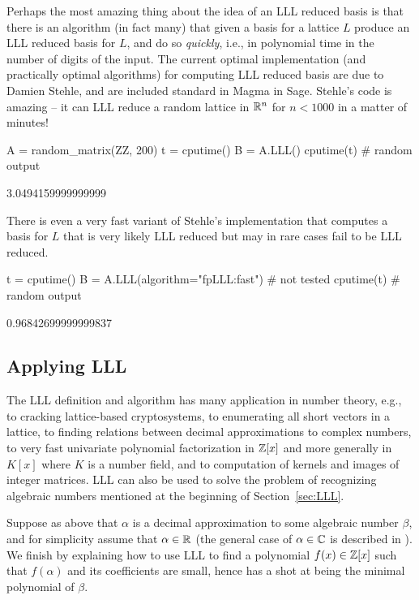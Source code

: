 Perhaps the most amazing thing about the idea of an LLL
reduced basis is that there is an algorithm (in fact many)
that given a basis for a lattice $L$ produce an LLL reduced
basis for $L$, and do so {\em quickly}, i.e., in polynomial
time in the number of digits of the input.   The current
optimal implementation (and practically optimal algorithms)
for computing LLL reduced basis are due to Damien Stehle,
and are included standard in Magma in Sage.   Stehle's code
is amazing -- it can LLL reduce a random lattice in $\mathbb{R}^{n}$
for $n<1000$ in a matter of minutes!
\begin{sagecode}
\begin{sagecell}
A = random_matrix(ZZ, 200)
t = cputime()
B = A.LLL()
cputime(t)     # random output
\end{sagecell}
\begin{sageout}
3.0494159999999999
\end{sageout}
\end{sagecode}

\noindent{}There is even a very fast variant of Stehle's implementation that computes a basis for $L$ that is very likely LLL reduced but may in rare
cases fail to be LLL reduced.

\begin{sagecode}
\begin{sagecell}
t = cputime()
B = A.LLL(algorithm="fpLLL:fast")   # not tested
cputime(t)      # random output
\end{sagecell}
\begin{sageout}
0.96842699999999837
\end{sageout}
\end{sagecode}

\subsection{Applying LLL}

The LLL definition and algorithm has many application in
number theory, e.g., to cracking lattice-based cryptosystems,
to enumerating all short vectors in a lattice, to finding relations
between decimal approximations to complex numbers, to very
fast univariate polynomial factorization in $\mathbb{Z}[x]$ and more
generally in $K[x]$ where $K$ is a number field, and to
computation of kernels and images of integer matrices.  LLL
can also be used to solve the problem of recognizing algebraic
numbers mentioned at the beginning of Section~\ref{sec:LLL}.

Suppose as above that $\alpha$ is a decimal approximation
to some algebraic number $\beta$, and for simplicity
assume that $\alpha\in\mathbb{R}$ (the general case of $\alpha \in \mathbb{C}$
is described in \cite{cohen:course_ant}).
We finish by explaining how to use LLL to find a polynomial
$f(x) \in \mathbb{Z}[x]$ such that $f(\alpha)$ and its coefficients
are small, hence has a shot at being the minimal polynomial
of $\beta$.

